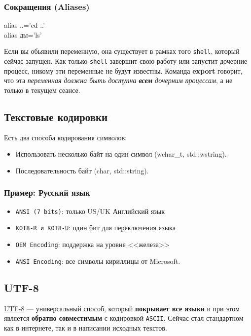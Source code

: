 \subsubsection{Сокращения (Aliases)}
alias ..='cd ..' \\
alias ды='ls'


Если вы обьявили переменную, она существует в рамках того \texttt{shell}, который сейчас запущен. Как только \texttt{shell} завершит свою работу или запустит дочерние процесс, никому эти переменные не будут известны. Команда \textbf{export} говорит, что эта \textit{переменная должна быть доступна \textbf{всем} дочерним процессам}, а не только в текущем сеансе. 


\subsection{Текстовые кодировки}

Есть два способа кодирования символов:
\begin{itemize}
	\item Использовать несколько байт на один символ (wchar\_t, std::wstring). 
	\item Последовательность байт (char, std::string).
\end{itemize}

\subsubsection{Пример: Русский язык}

\begin{itemize}
	\item \texttt{ANSI (7 bits)}: только US/UK Английский язык
	\item \texttt{KOI8-R и KOI8-U}: один бит для переключения языка
	\item \texttt{OEM Encoding}: поддержка на уровне <<железа>>
	\item \texttt{ANSI Encoding}: все символы кириллицы от Microsoft.
\end{itemize}

\subsection{UTF-8}

\begin{Def}
	\underline{UTF-8} --- универсальный способ, который \textbf{покрывает все языки} и при этом является \textbf{обратно совместимым} с кодировкой \texttt{ASCII}. Сейчас стал стандартном как в интернете, так и в написании исходных текстов.
\end{Def} 

